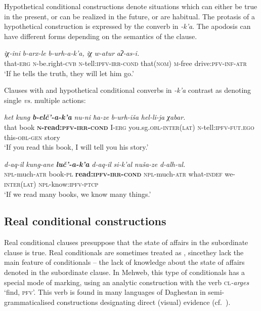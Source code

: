 ﻿\documentclass[output=paper]{langsci/langscibook}
\begin{document}

Hypothetical conditional constructions denote situations which can
either be true in the present, or can be realized in the future, or are
habitual. The protasis of a hypothetical construction is expressed by
the converb in \emph{-k'a}. The apodosis can have different forms
depending on the semantics of the clause.

\ea %
\gll \emph{iχ-ini} \emph{b-arx-le} \emph{b-urh-a-k'a,} \emph{iχ} \emph{w-atur} \emph{aʔ-as-i.}\\
 that-\textsc{erg} \textsc{n}-be.right-\textsc{cvb} \textsc{n}-tell:\textsc{ipfv}-\textsc{irr}-\textsc{cond} that(\textsc{nom}) \textsc{m}-free drive:\textsc{pfv}-\textsc{inf}-\textsc{atr}\\
\glt `If he tells the truth, they will let him go.'
\z

Clauses with  and  hypothetical conditional
converbs in \emph{-k'a} contrast as denoting single \emph{vs.} multiple
actions:

\ea %
\gll \emph{het} \emph{kung} \emph{\textbf{b-elč'-a-k'a}} \emph{nu-ni} \emph{ħa-ze} \emph{b-urh-iša} \emph{hel-li-ja} \emph{χabar.}\\
 that book \textbf{\textsc{n}-read:\textsc{pfv}-\textsc{irr}-\textsc{cond}} I-\textsc{erg} you.sg.\textsc{obl}-\textsc{inter}(\textsc{lat}) \textsc{n}-tell:\textsc{ipfv}-\textsc{fut}.\textsc{ego} this-\textsc{obl}-\textsc{gen} story\\
\glt `If you read this book, I will tell you his story.'

\ex %
\gll \emph{d-aq-il} \emph{kung-ane} \emph{\textbf{luč'-a-k'a}} \emph{d-aq-il} \emph{si-k'al} \emph{nuša-ze} \emph{d-alh-ul.}\\
 \textsc{npl}-much-\textsc{atr} book-\textsc{pl} \textbf{read:\textsc{ipfv}-\textsc{irr}-\textsc{cond}} \textsc{npl}-much-\textsc{atr} what-\textsc{indef} we-\textsc{inter}(\textsc{lat}) \textsc{npl}-know:\textsc{ipfv}-\textsc{ptcp} \\
\glt `If we read many books, we know many things.'
\z

\removelastskip
{}


\subsection{Real conditional constructions}\label{real-conditional-constructions}

Real conditional clauses presuppose that the state of affairs in the
subordinate clause is true. Real conditionals are sometimes treated as
, since\pagebreak[3] they lack the main feature of conditionals – the
lack of knowledge about the state of affairs denoted in the subordinate
clause. In Mehweb, this type of conditionals has a special mode of
marking, using an analytic construction with the verb
\textsc{cl}\emph{-arges} `find, \textsc{pfv}'. This verb is found in many languages
of Daghestan in semi-grammaticalised constructions designating direct
(visual) evidence (cf.\ \citealt{maisak-daniel2018}).
\end{document}
